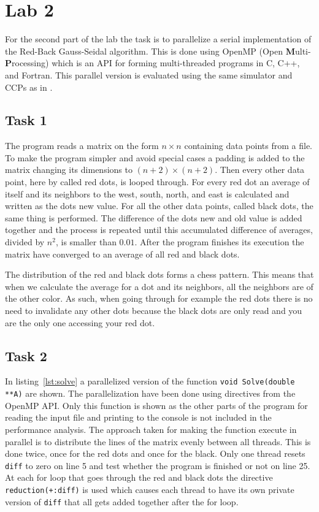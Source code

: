 \section{Lab 2}
\label{sec:lab2}
For the second part of the lab the task is to parallelize a serial implementation of the Red-Back Gauss-Seidal algorithm. This is done using OpenMP (Open \textbf Multi-\textbf Processing) which is an API for forming multi-threaded programs in C, C++, and Fortran. This parallel version is evaluated using the same simulator and CCPs as in . 

\subsection{Task 1}
The program reads a matrix on the form $n \times n$ containing data points from a file. To make the program simpler and avoid special cases a padding is added to the matrix changing its dimensions to $(n+2) \times (n+2)$. Then every other data point, here by called red dots, is looped through. For every red dot an average of itself and its neighbors to the west, south, north, and east is calculated and written as the dots new value. For all the other data points, called black dots, the same thing is performed. The difference of the dots new and old value is added together and the process is repeated until this accumulated difference of averages, divided by $n^2$, is smaller than $0.01$. After the program finishes its execution the matrix have converged to an average of all red and black dots.

The distribution of the red and black dots forms a chess pattern. This means that when we calculate the average for a dot and its neighbors, all the neighbors are of the other color. As such, when going through for example the red dots there is no need to invalidate any other dots because the black dots are only read and you are the only one accessing your red dot.

\subsection{Task 2}
\label{subsec:lab2:task2}
In listing~\ref{lst:solve} a parallelized version of the function \texttt{void Solve(double **A)} are shown. The parallelization have been done using directives from the OpenMP API. Only this function is shown as the other parts of the program for reading the input file and printing to the console is not included in the performance analysis. The approach taken for making the function execute in parallel is to distribute the lines of the matrix evenly between all threads. This is done twice, once for the red dots and once for the black. Only one thread resets \texttt{diff} to zero on line 5 and test whether the program is finished or not on line 25. At each for loop that goes through the red and black dots the directive \texttt{reduction(+:diff)} is used which causes each thread to have its own private version of \texttt{diff} that all gets added together after the for loop.

